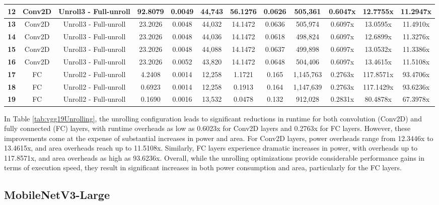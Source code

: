 \begin{table}[htbp]
{\begin{tabular}{|c|c|c|c|c|c|c|c|c|c|c|c|}
\textbf{12} & Conv2D & Unroll3 - Full-unroll & 92.8079 & 0.0049  & 44,743  & 56.1276 & 0.0626  & 505,361 & 0.6047x & 12.7755x & 11.2947x \\ \hline
\textbf{13} & Conv2D & Unroll3 - Full-unroll & 23.2026 & 0.0048  & 44,032  & 14.1472 & 0.0636  & 505,974 & 0.6097x & 13.0595x & 11.4910x \\ \hline
\textbf{14} & Conv2D & Unroll3 - Full-unroll & 23.2026 & 0.0048  & 44,036  & 14.1472 & 0.0618  & 498,824 & 0.6097x & 12.6899x & 11.3276x \\ \hline
\textbf{15} & Conv2D & Unroll3 - Full-unroll & 23.2026 & 0.0048  & 44,088  & 14.1472 & 0.0637  & 499,898 & 0.6097x & 13.0532x & 11.3386x \\ \hline
\textbf{16} & Conv2D & Unroll3 - Full-unroll & 23.2026 & 0.0052  & 43,820  & 14.1472 & 0.0648  & 504,406 & 0.6097x & 13.4615x & 11.5108x \\ \hline
\textbf{17} & FC  & Unroll2 - Full-unroll & 4.2408  & 0.0014  & 12,258  & 1.1721  & 0.165  & 1,145,763 & 0.2763x & 117.8571x & 93.4706x \\ \hline
\textbf{18} & FC  & Unroll2 - Full-unroll & 0.6923  & 0.0014  & 12,258  & 0.1913   & 0.164  & 1,147,639 & 0.2763x & 117.1429x & 93.6236x \\ \hline
\textbf{19} & FC  & Unroll2 - Full-unroll & 0.1690  & 0.0016  & 13,532  & 0.0478  & 0.132  & 912,028  & 0.2831x & 80.4878x & 67.3978x \\ \hline

\end{tabular}
}
\end{table}

In Table \ref{tab:vgg19Unrolling}, the unrolling configuration leads to significant reductions in runtime for both convolution (Conv2D) and fully connected (FC) layers, with runtime overheads as low as 0.6023x for Conv2D layers and 0.2763x for FC layers. However, these improvements come at the expense of substantial increases in power and area. For Conv2D layers, power overheads range from 12.3446x to 13.4615x, and area overheads reach up to 11.5108x. Similarly, FC layers experience dramatic increases in power, with overheads up to 117.8571x, and area overheads as high as 93.6236x. Overall, while the unrolling optimizations provide considerable performance gains in terms of execution speed, they result in significant increases in both power consumption and area, particularly for the FC layers.

\clearpage
\subsection{MobileNetV3-Large}
